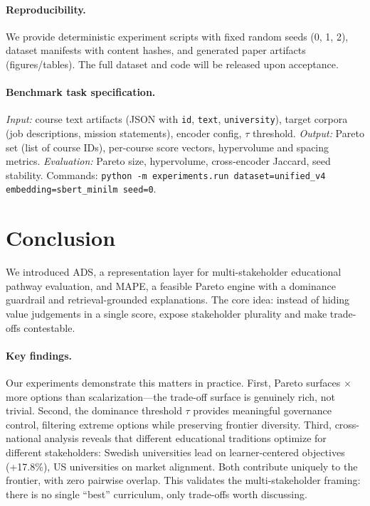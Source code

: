 \documentclass[sigconf,review]{acmart}
\newcommand{\ADS}{\textsc{ADS}\xspace}
\newcommand{\MAPE}{\textsc{MAPE}\xspace}
\begin{document}
\paragraph{Reproducibility.}
We provide deterministic experiment scripts with fixed random seeds (0, 1, 2), dataset manifests with content hashes, and generated paper artifacts (figures/tables). The full dataset and code will be released upon acceptance.

\paragraph{Benchmark task specification.}
\textit{Input:} course text artifacts (JSON with \texttt{id}, \texttt{text}, \texttt{university}), target corpora (job descriptions, mission statements), encoder config, $\tau$ threshold.
\textit{Output:} Pareto set (list of course IDs), per-course score vectors, hypervolume and spacing metrics.
\textit{Evaluation:} Pareto size, hypervolume, cross-encoder Jaccard, seed stability.
Commands: \texttt{python -m experiments.run dataset=unified\_v4 embedding=sbert\_minilm seed=0}.


\section{Conclusion}

We introduced \ADS, a representation layer for multi-stakeholder educational pathway evaluation, and \MAPE, a feasible Pareto engine with a dominance guardrail and retrieval-grounded explanations. The core idea: instead of hiding value judgements in a single score, expose stakeholder plurality and make trade-offs contestable.

\paragraph{Key findings.}
Our experiments demonstrate this matters in practice. First, Pareto surfaces {\ParetoVsBaselineRatio}$\times$ more options than scalarization---the trade-off surface is genuinely rich, not trivial. Second, the dominance threshold $\tau$ provides meaningful governance control, filtering extreme options while preserving frontier diversity. Third, cross-national analysis reveals that different educational traditions optimize for different stakeholders: Swedish universities lead on learner-centered objectives (+17.8\%), US universities on market alignment. Both contribute uniquely to the frontier, with zero pairwise overlap. This validates the multi-stakeholder framing: there is no single ``best'' curriculum, only trade-offs worth discussing.
\end{document}

